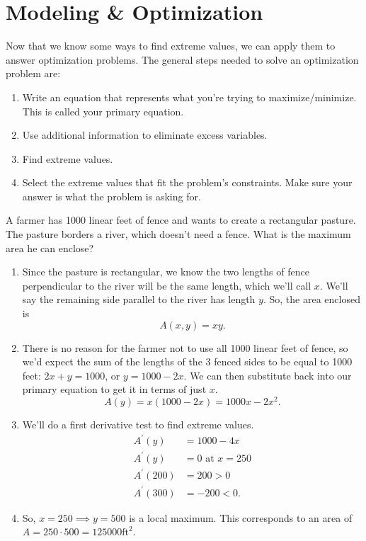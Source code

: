 \section{Modeling \& Optimization}
Now that we know some ways to find extreme values, we can apply them to answer optimization problems.
The general steps needed to solve an optimization problem are:
\begin{enumerate}
	\item Write an equation that represents what you're trying to maximize/minimize. This is called your primary equation.
	\item Use additional information to eliminate excess variables.
	\item Find extreme values.
	\item Select the extreme values that fit the problem's constraints. Make sure your answer is what the problem is asking for.
\end{enumerate}

\begin{example}
	A farmer has 1000 linear feet of fence and wants to create a rectangular pasture.
	The pasture borders a river, which doesn't need a fence.
	What is the maximum area he can enclose?
\end{example}
\begin{enumerate}
	\item Since the pasture is rectangular, we know the two lengths of fence perpendicular to the river will be the same length, which we'll call $x$.
		We'll say the remaining side parallel to the river has length $y$.
		So, the area enclosed is
		\begin{equation*}
			A(x,y) = xy.
		\end{equation*}
	\item There is no reason for the farmer not to use all 1000 linear feet of fence, so we'd expect the sum of the lengths of the 3 fenced sides to be equal to 1000 feet: $2x + y = 1000$, or $y = 1000 - 2x$.
		We can then substitute back into our primary equation to get it in terms of just $x$.
		\begin{equation*}
			A(y) = x(1000-2x) = 1000x - 2x^2.
		\end{equation*}
	\item We'll do a first derivative test to find extreme values.
	\begin{align*}
		A^\prime(y) &= 1000 - 4x \\
		A^\prime(y) &= 0 \text{ at } x = 250 \\
		A^\prime(200) &= 200 > 0 \\
		A^\prime(300) &= -200 < 0.
	\end{align*}
	\item So, $x=250 \implies y = 500$ is a local maximum.
		This corresponds to an area of $A = 250\cdot 500 = 125000\text{ft}^2$.
\end{enumerate}

